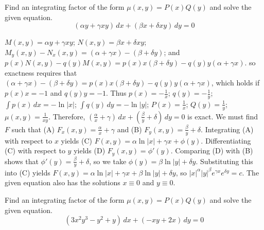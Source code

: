 \documentclass{ximera}
\begin{document}
 \begin{problem}\label{exer:2.6.18} Find an integrating factor of the form $\mu(x,y)=P(x)Q(y)$ and solve the given equation.
 $$(\alpha y+ \gamma xy)\,dx+(\beta x+ \delta xy)\,dy=0$$

 

 \begin{solution}
     $M(x,y)=\alpha y+\gamma xy$;\;
$N(x,y)=\beta x+ \delta xy$;\;
 $M_y(x,y)-N_x(x,y)=(\alpha+\gamma x)-(\beta+\delta y)$;
and  $p(x)N(x,y)-q(y)M(x,y)=p(x)x(\beta + \delta y)-
q(y)y(\alpha +\gamma x)$.
so exactness requires that
 $(\alpha+\gamma x)-(\beta+\delta y)=
p(x)x(\beta+\delta y)-
q(y)y(\alpha+\gamma x)$,
which holds if
  $p(x)x=-1$ and $q(y)y=-1$. Thus
 $p(x)=-\frac{1}{ x}$;\;
 $q(y)=-\frac{1}{ y}$;\;
$\int p(x)\,dx=-\ln|x|$;\;
$\int q(y)\,dy=-\ln|y|$;\;
$P(x)=\frac{1}{ x}$;
$Q(y)=\frac{1}{ y}$;
$\mu(x,y)=\frac{1}{ xy}$.
Therefore,
$\left(\frac{\alpha}{ x}+\gamma\right)\,dx+
\left(\frac{\beta}{ y}+\delta\right)\,dy=0$
is exact.
We must find $F$ such that
(A) $F_x(x,y)=\frac{\alpha}{ x}+\gamma$ and
(B) $F_y(x,y)=\frac{\beta}{ y}+\delta$.
Integrating (A) with respect to $x$ yields
(C) $F(x,y)=\alpha\ln|x|+\gamma x+\phi(y)$.
Differentiating (C) with respect to $y$  yields
(D) $F_y(x,y)=\phi'(y)$.
Comparing (D) with (B)  shows that
$\phi'(y)=\frac{\beta}{ y}+\delta$, so we take
$\phi(y)=\beta\ln|y|+\delta y$.
Substituting this into (C) yields
$F(x,y)=\alpha\ln|x|+\gamma x+\beta\ln|y|+\delta y$,
so $|x|^\alpha|y|^\beta e^{\gamma x}e^{\delta y}=c$.
The given equation also has the solutions $x\equiv0$
and $y\equiv0$.

 \end{solution}

 \end{problem}

\begin{problem}\label{exer:2.6.19}Find an integrating factor of the form $\mu(x,y)=P(x)Q(y)$ and solve the given equation.
$$(3x^2y^3-y^2+y)\,dx+(-xy+2x)\,dy=0$$
\end{problem}
\end{document}
